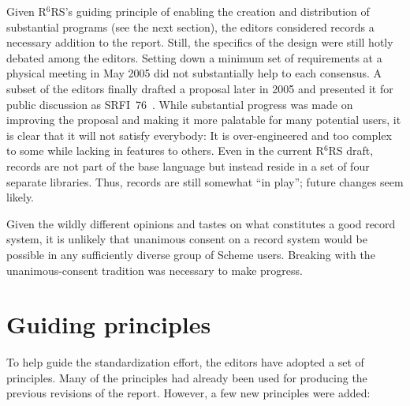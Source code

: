 \documentclass{sigplanconf}
\newcommand{\rn}[1]{R$^{#1}$RS}
\begin{document}
Given \rn{6}'s guiding principle of enabling the creation and
distribution of substantial programs (see the next section), the
editors considered records a necessary addition to the report.  Still,
the specifics of the design were still hotly debated among the
editors.  Setting down a minimum set of requirements at a physical
meeting in May 2005 did not substantially help to each consensus.  A
subset of the editors finally drafted a proposal later in 2005 and
presented it for public discussion as SRFI~76~\cite{srfi76}.  While
substantial progress was made on improving the proposal and making it
more palatable for many potential users, it is clear that it will not
satisfy everybody: It is over-engineered and too complex to some while
lacking in features to others.  Even in the current \rn{6} draft,
records are not part of the base language but instead reside in a set
of four separate libraries.  Thus, records are still somewhat ``in
play''; future changes seem likely.

Given the wildly different opinions and tastes on what constitutes a
good record system, it is unlikely that unanimous consent on a record
system would be possible in any sufficiently diverse group of Scheme users.
Breaking with the unanimous-consent tradition was necessary to make
progress.

\section{Guiding principles}
\label{sec:principles}

To help guide the standardization effort, the editors have adopted a
set of principles.  Many of the principles had already been used for
producing the previous revisions of the report.  However, a few new
principles were added:
\end{document}
